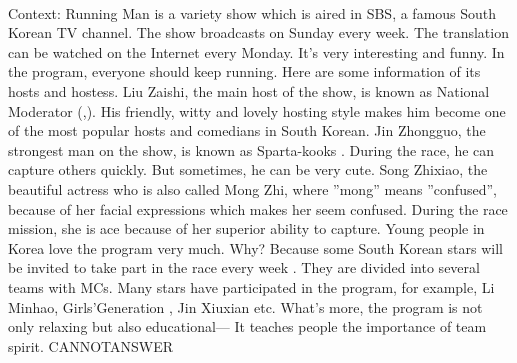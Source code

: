 \documentclass[11pt,a4paper, onecolumn]{article}
\begin{document}
\\ Context: Running Man is a variety show which is aired in SBS, a famous South Korean TV channel. The show broadcasts on Sunday every week. The translation can be watched on the Internet every Monday. It's very interesting and funny. In the program, everyone should keep running. Here are some information of its hosts and hostess. Liu Zaishi, the main host of the show, is known as National Moderator (,). His friendly, witty and lovely hosting style makes him become one of the most popular hosts and comedians in South Korean. Jin Zhongguo, the strongest man on the show, is known as Sparta-kooks . During the race, he can capture others quickly. But sometimes, he can be very cute. Song Zhixiao, the beautiful actress who is also called Mong Zhi, where ''mong'' means ''confused'', because of her facial expressions which makes her seem confused. During the race mission, she is ace because of her superior ability to capture. Young people in Korea love the program very much. Why? Because some South Korean stars will be invited to take part in the race every week . They are divided into several teams with MCs. Many stars have participated in the program, for example, Li Minhao, Girls'Generation , Jin Xiuxian etc. What's more, the program is not only relaxing but also educational--- It teaches people the importance of team spirit. CANNOTANSWER
\end{document}
